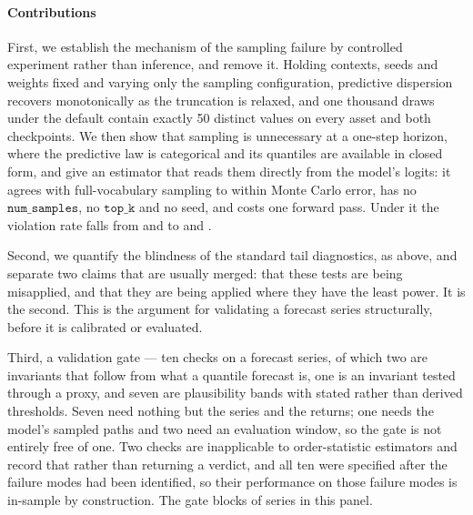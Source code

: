 \documentclass[preprint,11pt,authoryear]{elsarticle}
\newcommand{\1}{\boldsymbol{1}}
\begin{document}
\paragraph{Contributions} First, we establish the mechanism of the sampling
failure by controlled experiment rather than inference, and remove it. Holding
contexts, seeds and weights fixed and varying only the sampling configuration,
predictive dispersion recovers monotonically as the truncation is relaxed, and
one thousand draws under the default contain exactly 50 distinct values on every
asset and both checkpoints. We then show that sampling is unnecessary at a
one-step horizon, where the predictive law is categorical and its quantiles are
available in closed form, and give an estimator that reads them directly from the
model's logits: it agrees with full-vocabulary sampling to within Monte Carlo
error, has no $\texttt{num\_samples}$, no $\texttt{top\_k}$ and no seed, and
costs one forward pass. Under it the violation rate falls from
\nPiSmallDefaultOne{} and \nPiMiniDefaultOne{} to \nPiSmallAnalyticOne{} and
\nPiMiniAnalyticOne.

Second, we quantify the blindness of the standard tail diagnostics, as above,
and separate two claims that are usually merged: that these tests are being
misapplied, and that they are being applied where they have the least power. It
is the second. This is the argument for validating a forecast series
structurally, before it is calibrated or evaluated.

Third, a validation gate --- ten checks on a forecast series, of
which two are invariants that follow from what a quantile forecast is, one is an
invariant tested through a proxy, and seven are plausibility bands with
stated rather than derived thresholds. Seven need nothing but the series and the
returns; one needs the model's sampled paths and two need an evaluation window,
so the gate is not entirely free of one. Two
checks are inapplicable to order-statistic estimators and record that rather than
returning a verdict, and all ten were specified after the failure modes had been
identified, so their performance on those failure modes is in-sample by
construction. The gate blocks \nGateBlocked{} of \nGateSeries{} series in this
panel.
\end{document}
